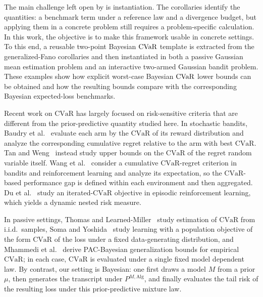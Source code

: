 \documentclass[conference]{IEEEtran}
\begin{document}
The main challenge left open by \cite{bongole2026generalizing} is instantiation. The corollaries identify the quantities: a benchmark term under a reference law and a divergence budget, but applying them in a concrete problem still requires a problem-specific calculation. In this work, the objective is to make this framework usable in concrete settings. To this end, a reusable two-point Bayesian \(\textup{CVaR}\) template is extracted from the generalized-Fano corollaries and then instantiated in both a passive Gaussian mean estimation problem and an interactive two-armed Gaussian bandit problem. These examples show how explicit worst-case Bayesian \(\textup{CVaR}\) lower bounds can be obtained and how the resulting bounds compare with the corresponding Bayesian expected-loss benchmarks.

Recent work on \(\mathrm{CVaR}\) has largely focused on risk-sensitive criteria that are different from the prior-predictive quantity studied here. In stochastic bandits, Baudry et al.~\cite{baudry2021optimal} evaluate each arm by the \(\mathrm{CVaR}\) of its reward distribution and analyze the corresponding cumulative regret relative to the arm with best \(\mathrm{CVaR}\). Tan and Weng~\cite{tan2023cvar} instead study upper bounds on the \(\mathrm{CVaR}\) of the regret random variable itself. Wang et al.~\cite{wang2023near} consider a cumulative \(\mathrm{CVaR}\)-regret criterion in bandits and reinforcement learning and analyze its expectation, so the \(\mathrm{CVaR}\)-based performance gap is defined within each environment and then aggregated. Du et al.~\cite{du2022provably} study an iterated-\(\mathrm{CVaR}\) objective in episodic reinforcement learning, which yields a dynamic nested risk measure. 

In passive settings, Thomas and Learned-Miller~\cite{thomas2019concentration} study estimation of \(\mathrm{CVaR}\) from i.i.d.\ samples, Soma and Yoshida~\cite{soma2020statistical} study learning with a population objective of the form \(\mathrm{CVaR}\) of the loss under a fixed data-generating distribution, and Mhammedi et al.~\cite{mhammedi2020pacbayes} derive PAC-Bayesian generalization bounds for empirical \(\mathrm{CVaR}\); in each case, \(\mathrm{CVaR}\) is evaluated under a single fixed model dependent law. By contrast, our setting is Bayesian: one first draws a model \(M\) from a prior \(\mu\), then generates the transcript under \(P^{M,\mathrm{Alg}}\), and finally evaluates the tail risk of the resulting loss under this prior-predictive mixture law. 
\end{document}
